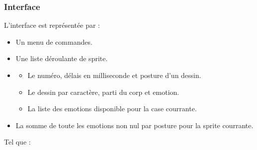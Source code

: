 \documentclass{report}
\begin{document}
\subsubsection{Interface}

L'interface est représentée par :

\begin{itemize}
	\item Un menu de commandes.
	\item Une liste déroulante de sprite.
    \item {
		\begin{itemize}
			\item Le numéro, délais en milliseconde et posture d'un dessin.
			\item Le dessin par caractère, parti du corp et emotion.
			\item La liste des emotions disponible pour la case courrante.
		\end{itemize}
    }
    \item La somme de toute les emotions non nul par posture pour la sprite courrante. \\
\end{itemize}

Tel que :
\end{document}
